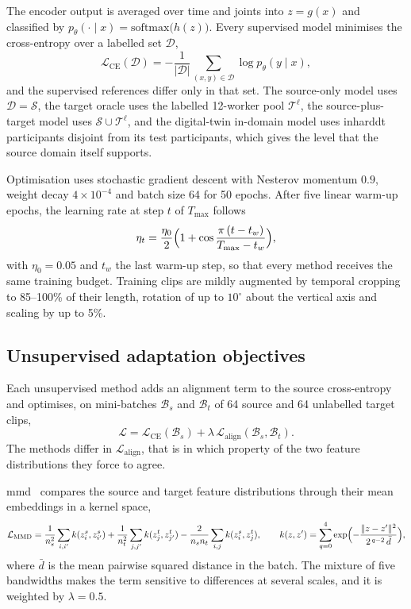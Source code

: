 \documentclass[pdflatex,sn-mathphys-num]{sn-jnl}
\begin{document}
The encoder output is averaged over time and joints into $z=g(x)$ and
classified by $p_\theta(\cdot\mid x)=\mathrm{softmax}\bigl(h(z)\bigr)$. Every
supervised model minimises the cross-entropy over a labelled set $\mathcal{D}$,
\begin{equation}
  \mathcal{L}_{\mathrm{CE}}(\mathcal{D})=-\frac{1}{|\mathcal{D}|}
  \sum_{(x,y)\in\mathcal{D}}\log p_\theta(y\mid x),
  \label{eq:ce}
\end{equation}
and the supervised references differ only in that set. The source-only model
uses $\mathcal{D}=\mathcal{S}$, the target oracle uses the labelled 12-worker
pool $\mathcal{T}^{\ell}$, the source-plus-target model uses
$\mathcal{S}\cup\mathcal{T}^{\ell}$, and the digital-twin in-domain model uses
\acs{inharddt} participants disjoint from its test participants, which gives
the level that the source domain itself supports.

Optimisation uses stochastic gradient descent with Nesterov momentum $0.9$,
weight decay $4\times10^{-4}$ and batch size 64 for 50 epochs. After five
linear warm-up epochs, the learning rate at step $t$ of $T_{\max}$ follows
\begin{equation}
  \eta_t=\frac{\eta_0}{2}\Bigl(1+\cos\frac{\pi\,(t-t_w)}{T_{\max}-t_w}\Bigr),
  \label{eq:lr}
\end{equation}
with $\eta_0=0.05$ and $t_w$ the last warm-up step, so that every method
receives the same training budget. Training clips are mildly augmented by
temporal cropping to 85--100\% of their length, rotation of up to $10^\circ$
about the vertical axis and scaling by up to 5\%.

\subsection{Unsupervised adaptation objectives}

Each unsupervised method adds an alignment term to the source cross-entropy and
optimises, on mini-batches $\mathcal{B}_s$ and $\mathcal{B}_t$ of 64 source and
64 unlabelled target clips,
\begin{equation}
  \mathcal{L}=\mathcal{L}_{\mathrm{CE}}(\mathcal{B}_s)
  +\lambda\,\mathcal{L}_{\mathrm{align}}(\mathcal{B}_s,\mathcal{B}_t).
  \label{eq:uda}
\end{equation}
The methods differ in $\mathcal{L}_{\mathrm{align}}$, that is in which property
of the two feature distributions they force to agree.

\ac{mmd}~\cite{long2015dan} compares the source and target feature
distributions through their mean embeddings in a kernel space,
\begin{equation}
  \mathcal{L}_{\mathrm{MMD}}=\frac{1}{n_s^2}\sum_{i,i'}k(z_i^s,z_{i'}^s)
  +\frac{1}{n_t^2}\sum_{j,j'}k(z_j^t,z_{j'}^t)
  -\frac{2}{n_sn_t}\sum_{i,j}k(z_i^s,z_j^t),\qquad
  k(z,z')=\sum_{q=0}^{4}\exp\Bigl(-\frac{\|z-z'\|^2}{2^{\,q-2}\,\bar{d}}\Bigr),
  \label{eq:mmd}
\end{equation}
where $\bar{d}$ is the mean pairwise squared distance in the batch. The mixture
of five bandwidths makes the term sensitive to differences at several scales,
and it is weighted by $\lambda=0.5$.
\end{document}
